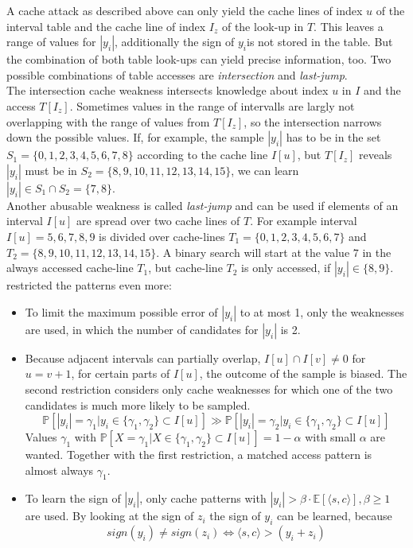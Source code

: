 A cache attack as described above can only yield the cache lines of index $u$ of the interval table and the cache line of index $I_z$ of the look-up in $T$. This leaves a range of values for $|y_i|$, additionally the sign of $y_i$is not stored in the table. But the combination of both table look-ups can yield precise information, too.
Two possible combinations of table accesses are \textit{intersection} and \textit{last-jump}. \\
The intersection cache weakness intersects knowledge about index $u$ in $I$ and the access $T[I_z]$. Sometimes values in the range of intervalls are largly not overlapping with the range of values from $T[I_z]$, so the intersection %
narrows down the possible values. If, for example, the sample $|y_i|$ has to be in the set $S_1 = \{0,1,2,3,4,5,6,7,8\}$ according to the cache line $I[u]$, but $T[I_z]$ reveals $|y_i|$ must be in $S_2 = \{8,9,10,11,12,13,14,15\}$, we can learn $|y_i| \in S_1 \cap S_2 = \{7,8\}$.\\
Another abusable weakness is called \textit{last-jump} and can be used if elements of an interval $I[u]$ are spread over two cache lines of $T$. For example interval $I[u] = {5,6,7,8,9}$ is divided over cache-lines $T_1 = \{0,1,2,3,4,5,6,7\}$ and $T_2 = \{8,9,10,11,12,13,14,15\}$. A binary search will start at the value $7$ in the always accessed cache-line $T_1$, but cache-line $T_2$ is only accessed, if $|y_i| \in \{8,9\}$.\\
\cite{cryptoeprint:2016:300} restricted the patterns even more: 
\begin{itemize}
	\item To limit the maximum possible error of $|y_i|$ to at most 1, only the weaknesses are used, in which the number of candidates for $|y_i|$ is 2.
	\item Because adjacent intervals can partially overlap, $I[u] \cap I[v] \neq 0$ for $u = v+1$, for certain parts of $I[u]$, the outcome of the sample is biased.
	The second restriction considers only cache weaknesses for which one of the two candidates is much more likely to be sampled.
	\begin{equation*}
		\mathbb{P}[|y_i| = \gamma_1 | y_i \in \{\gamma_1,\gamma_2\}\subset I[u]] \gg \mathbb{P}[|y_i| = \gamma_2 | y_i \in \{\gamma_1,\gamma_2\}\subset I[u]]	
	\end{equation*}
	Values $\gamma_1$ with $\mathbb{P}[X=\gamma_1 | X \in \{\gamma_1, \gamma_2\}\subset I[u]] = 1-\alpha$ with small $\alpha$ are wanted.
	Together with the first restriction, a matched access pattern is almost always $\gamma_1$.
	\item To learn the sign of $|y_i|$, only cache patterns with $|y_i| > \beta \cdot \mathbb{E}[\langle s,c \rangle ], \beta \ge 1$ are used. By looking at the sign of $z_i$ the sign of $y_i$ can be learned, because 
	\begin{equation*}
	sign(y_i) \neq sign(z_i) \iff \langle s,c \rangle > (y_i+z_i)	
	\end{equation*}
\end{itemize}
